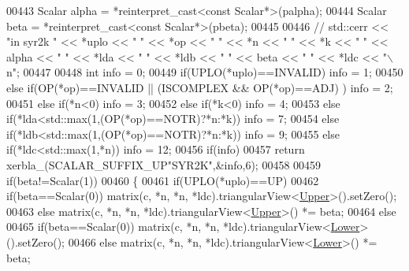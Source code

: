 \begin{DoxyCode}
00443   Scalar alpha = *\textcolor{keyword}{reinterpret\_cast<}\textcolor{keyword}{const }Scalar*\textcolor{keyword}{>}(palpha);
00444   Scalar beta  = *\textcolor{keyword}{reinterpret\_cast<}\textcolor{keyword}{const }Scalar*\textcolor{keyword}{>}(pbeta);
00445 
00446 \textcolor{comment}{//   std::cerr << "in syr2k " << *uplo << " " << *op << " " << *n << " " << *k << " " << alpha << " " <<
       *lda << " " << *ldb << " " << beta << " " << *ldc << "\(\backslash\)n";}
00447 
00448   \textcolor{keywordtype}{int} info = 0;
00449   \textcolor{keywordflow}{if}(UPLO(*uplo)==INVALID)                                            info = 1;
00450   \textcolor{keywordflow}{else} \textcolor{keywordflow}{if}(OP(*op)==INVALID || (ISCOMPLEX && OP(*op)==ADJ) )           info = 2;
00451   \textcolor{keywordflow}{else} \textcolor{keywordflow}{if}(*n<0)                                                       info = 3;
00452   \textcolor{keywordflow}{else} \textcolor{keywordflow}{if}(*k<0)                                                       info = 4;
00453   \textcolor{keywordflow}{else} \textcolor{keywordflow}{if}(*lda<std::max(1,(OP(*op)==NOTR)?*n:*k))                     info = 7;
00454   \textcolor{keywordflow}{else} \textcolor{keywordflow}{if}(*ldb<std::max(1,(OP(*op)==NOTR)?*n:*k))                     info = 9;
00455   \textcolor{keywordflow}{else} \textcolor{keywordflow}{if}(*ldc<std::max(1,*n))                                        info = 12;
00456   \textcolor{keywordflow}{if}(info)
00457     \textcolor{keywordflow}{return} xerbla\_(SCALAR\_SUFFIX\_UP\textcolor{stringliteral}{"SYR2K"},&info,6);
00458 
00459   \textcolor{keywordflow}{if}(beta!=Scalar(1))
00460   \{
00461     \textcolor{keywordflow}{if}(UPLO(*uplo)==UP)
00462       \textcolor{keywordflow}{if}(beta==Scalar(0)) matrix(c, *n, *n, *ldc).triangularView<\hyperlink{group__enums_gga39e3366ff5554d731e7dc8bb642f83cda6bcb58be3b8b8ec84859ce0c5ac0aaec}{Upper}>().setZero();
00463       \textcolor{keywordflow}{else}                matrix(c, *n, *n, *ldc).triangularView<\hyperlink{group__enums_gga39e3366ff5554d731e7dc8bb642f83cda6bcb58be3b8b8ec84859ce0c5ac0aaec}{Upper}>() *= beta;
00464     \textcolor{keywordflow}{else}
00465       \textcolor{keywordflow}{if}(beta==Scalar(0)) matrix(c, *n, *n, *ldc).triangularView<\hyperlink{group__enums_gga39e3366ff5554d731e7dc8bb642f83cda891792b8ed394f7607ab16dd716f60e6}{Lower}>().setZero();
00466       \textcolor{keywordflow}{else}                matrix(c, *n, *n, *ldc).triangularView<\hyperlink{group__enums_gga39e3366ff5554d731e7dc8bb642f83cda891792b8ed394f7607ab16dd716f60e6}{Lower}>() *= beta;

\end{DoxyCode}
